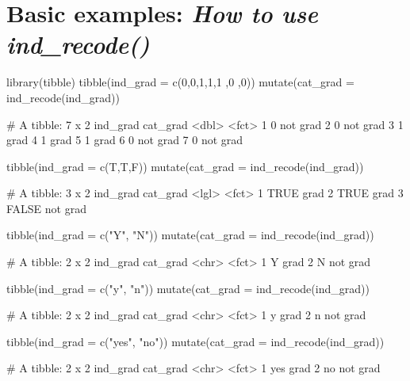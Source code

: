 \hypertarget{basic-examples-how-to-use-ind_recode}{%
\section{\texorpdfstring{Basic examples: \emph{How to use
ind\_recode()}}{Basic examples: How to use ind\_recode()}}\label{basic-examples-how-to-use-ind_recode}}

\begin{Schunk}
\begin{Sinput}
library(tibble)
tibble(ind_grad = c(0,0,1,1,1 ,0 ,0)) %
  mutate(cat_grad  = ind_recode(ind_grad))
\end{Sinput}
\begin{Soutput}
     # A tibble: 7 x 2
       ind_grad cat_grad
          <dbl> <fct>   
     1        0 not grad
     2        0 not grad
     3        1 grad    
     4        1 grad    
     5        1 grad    
     6        0 not grad
     7        0 not grad
\end{Soutput}
\begin{Sinput}
tibble(ind_grad = c(T,T,F)) %
  mutate(cat_grad  = ind_recode(ind_grad))
\end{Sinput}
\begin{Soutput}
     # A tibble: 3 x 2
       ind_grad cat_grad
       <lgl>    <fct>   
     1 TRUE     grad    
     2 TRUE     grad    
     3 FALSE    not grad
\end{Soutput}
\begin{Sinput}
tibble(ind_grad = c("Y", "N")) %
  mutate(cat_grad  = ind_recode(ind_grad))
\end{Sinput}
\begin{Soutput}
     # A tibble: 2 x 2
       ind_grad cat_grad
       <chr>    <fct>   
     1 Y        grad    
     2 N        not grad
\end{Soutput}
\begin{Sinput}
tibble(ind_grad = c("y", "n")) %
  mutate(cat_grad  = ind_recode(ind_grad))
\end{Sinput}
\begin{Soutput}
     # A tibble: 2 x 2
       ind_grad cat_grad
       <chr>    <fct>   
     1 y        grad    
     2 n        not grad
\end{Soutput}
\begin{Sinput}
tibble(ind_grad = c("yes", "no")) %
  mutate(cat_grad  = ind_recode(ind_grad))
\end{Sinput}
\begin{Soutput}
     # A tibble: 2 x 2
       ind_grad cat_grad
       <chr>    <fct>   
     1 yes      grad    
     2 no       not grad
\end{Soutput}
\end{Schunk}

